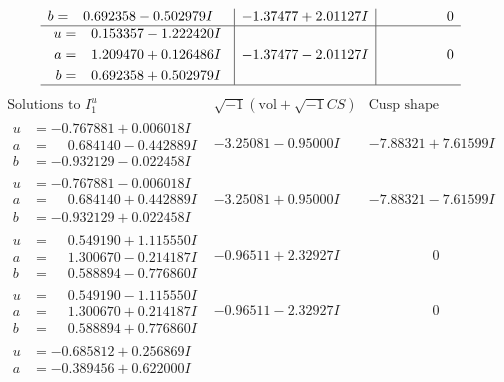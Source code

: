 \documentclass[1p]{elsarticle_modified}
\theoremstyle{definition}
\newcommand{\I}{\sqrt{-1}}
\begin{document}
$$\begin{array}{c|c|c}
\begin{aligned}
b &= \phantom{-}0.692358 - 0.502979 I\end{aligned}
 & -1.37477 + 2.01127 I & \phantom{-0.000000 } 0 \\ \hline\begin{aligned}
u &= \phantom{-}0.153357 - 1.222420 I \\
a &= \phantom{-}1.209470 + 0.126486 I \\
b &= \phantom{-}0.692358 + 0.502979 I\end{aligned}
 & -1.37477 - 2.01127 I & \phantom{-0.000000 } 0\\
 \hline 
 \end{array}$$\newpage$$\begin{array}{c|c|c}  
\text{Solutions to }I^u_{1}& \I (\text{vol} + \sqrt{-1}CS) & \text{Cusp shape}\\
 \hline 
\begin{aligned}
u &= -0.767881 + 0.006018 I \\
a &= \phantom{-}0.684140 - 0.442889 I \\
b &= -0.932129 - 0.022458 I\end{aligned}
 & -3.25081 - 0.95000 I & -7.88321 + 7.61599 I \\ \hline\begin{aligned}
u &= -0.767881 - 0.006018 I \\
a &= \phantom{-}0.684140 + 0.442889 I \\
b &= -0.932129 + 0.022458 I\end{aligned}
 & -3.25081 + 0.95000 I & -7.88321 - 7.61599 I \\ \hline\begin{aligned}
u &= \phantom{-}0.549190 + 1.115550 I \\
a &= \phantom{-}1.300670 - 0.214187 I \\
b &= \phantom{-}0.588894 - 0.776860 I\end{aligned}
 & -0.96511 + 2.32927 I & \phantom{-0.000000 } 0 \\ \hline\begin{aligned}
u &= \phantom{-}0.549190 - 1.115550 I \\
a &= \phantom{-}1.300670 + 0.214187 I \\
b &= \phantom{-}0.588894 + 0.776860 I\end{aligned}
 & -0.96511 - 2.32927 I & \phantom{-0.000000 } 0 \\ \hline\begin{aligned}
u &= -0.685812 + 0.256869 I \\
a &= -0.389456 + 0.622000 I \\

\end{aligned}
\end{array}$$
\end{document}
